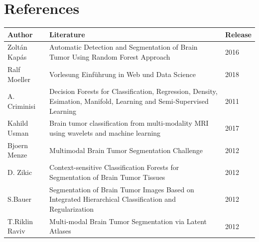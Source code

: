 \documentclass[
12pt,
headsepline,
bibliography=totoc,
twoside=semi,
]{scrartcl}
\begin{document}
\section{References\label{sec.sec5}}




\begin{table}[H]
 \footnotesize
 \vspace{1ex}
 \centering 
 \begin{tabular}{p{2.5cm}p{8.7cm}p{2.8cm}}
 \toprule
 \textbf{Author} & \textbf{Literature} & \textbf{Release} \\
 \midrule
 Zoltán Kapás & Automatic Detection and Segmentation of Brain Tumor Using Random Forest Approach & 2016 \\
 Ralf Moeller & Vorlesung Einführung in Web und Data Science & 2018 \\
 A. Criminisi & Decision Forests for Classification, Regression, Density, Esimation, Manifold, Learning and Semi-Supervised Learning & 2011 \\
 Kahild Usman & Brain tumor classification from multi-modality MRI using wavelets and machine learning & 2017 \\
 Bjoern Menze&Multimodal Brain Tumor Segmentation Challenge&2012\\
 D. Zikic&Context-sensitive Classification Forests for Segmentation of Brain Tumor Tissues&2012\\
 S.Bauer&Segmentation of Brain Tumor Images Based on Integrated Hierarchical Classification and Regularization&2012\\
 T.Riklin Raviv&Multi-modal Brain Tumor Segmentation via Latent Atlases&2012


 \end{tabular}
 \vspace{2ex}
\end{table}


%
%
\end{document}
